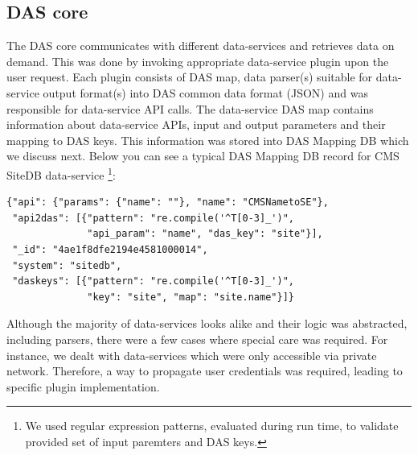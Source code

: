 \documentclass[a4paper]{jpconf}
\begin{document}
\subsection{DAS core}
The DAS core communicates with different data-services and retrieves
data on demand. This was done by invoking appropriate data-service plugin
upon the user request. Each plugin consists of DAS map,
data parser(s) suitable for data-service output format(s) into DAS common
data format (JSON) and was responsible for data-service API calls.
The data-service DAS map contains information about data-service APIs,
input and output parameters and their mapping to DAS keys. 
This information was stored into DAS Mapping DB which we discuss next.
Below you can see a typical DAS Mapping DB record for CMS
SiteDB data-service \cite{SiteDB}\footnote{We used regular expression 
patterns, evaluated during run time, to validate provided set of input 
paremters and DAS keys.}:
\begin{verbatim}
{"api": {"params": {"name": ""}, "name": "CMSNametoSE"}, 
 "api2das": [{"pattern": "re.compile('^T[0-3]_')", 
              "api_param": "name", "das_key": "site"}], 
 "_id": "4ae1f8dfe2194e4581000014", 
 "system": "sitedb", 
 "daskeys": [{"pattern": "re.compile('^T[0-3]_')", 
              "key": "site", "map": "site.name"}]}
\end{verbatim}
Although the majority of data-services looks alike
and their logic was abstracted, including parsers, there were a few
cases where special care was required. For instance,
we dealt with data-services which were only accessible via private network.
Therefore, a way to propagate user credentials was required, leading
to specific plugin implementation.

\end{document}
